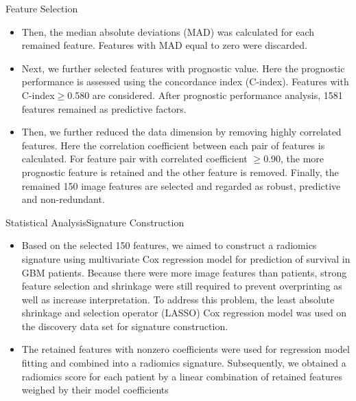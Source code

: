 \documentclass[
]{beamer}
\begin{document}
	\begin{frame}{Feature Selection}
		\begin{itemize}
			\item Then, the median absolute deviations (MAD) was calculated for each remained feature. Features with MAD
			equal to zero were discarded.
			\item Next, we further selected features with prognostic value. Here the prognostic performance is assessed
			using the concordance index (C-index).  Features with C-index$\geq$0.580 are considered.  After prognostic performance analysis, 1581 features remained
			as predictive factors.
			\item Then, we further reduced
			the data dimension by removing highly correlated features. Here the correlation coefficient between each pair of
			features is calculated. For feature pair with correlated coefficient $\geq$0.90, the more prognostic feature is retained
			and the other feature is removed. Finally, the remained 150 image features are selected and regarded as robust,
			predictive and non-redundant.
		\end{itemize}
	\end{frame}
	
	\begin{frame}{Statistical Analysis}{Signature Construction}
		\begin{itemize}
			\item Based on the selected 150 features, we aimed to construct a radiomics signature using
			multivariate Cox regression model for prediction of survival in GBM patients. Because there were more image
			features than patients, strong feature selection and shrinkage were still required to prevent overprinting as well as
			increase interpretation. To address this problem, the least absolute shrinkage and selection operator (LASSO) Cox
			regression model was used on the discovery data set for signature construction.
			\item  The retained features with nonzero coefficients were
			used for regression model fitting and combined into a radiomics signature. Subsequently, we obtained a radiomics
			score for each patient by a linear combination of retained features weighed by their model coefficients
		\end{itemize}
	\end{frame}
	
\end{document}
